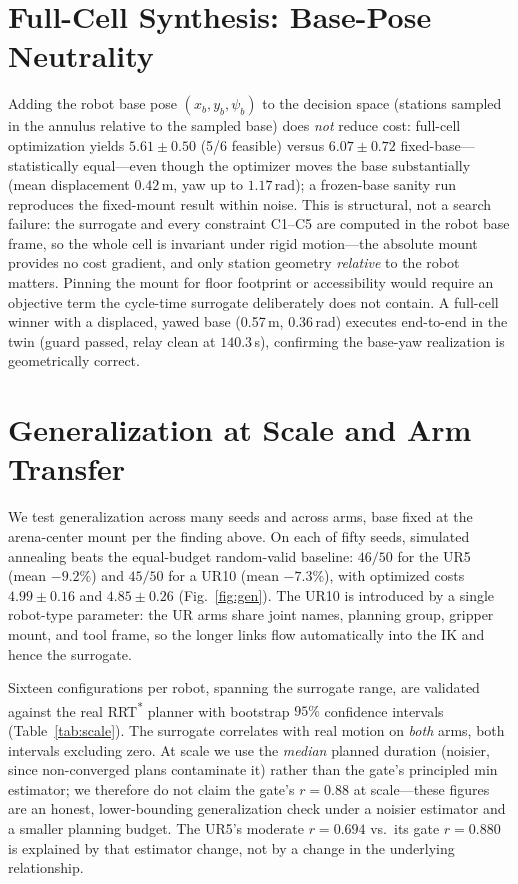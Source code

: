 \documentclass[conference]{IEEEtran}
\begin{document}
\section{Full-Cell Synthesis: Base-Pose Neutrality}
\label{sec:fullcell}
Adding the robot base pose $(x_b,y_b,\psi_b)$ to the decision space (stations sampled in the
annulus relative to the sampled base) does \emph{not} reduce cost: full-cell optimization yields
$5.61\pm0.50$ (5/6 feasible) versus $6.07\pm0.72$ fixed-base---statistically equal---even though
the optimizer moves the base substantially (mean displacement $0.42$\,m, yaw up to $1.17$\,rad);
a frozen-base sanity run reproduces the fixed-mount result within noise. This is structural, not
a search failure: the surrogate and every constraint C1--C5 are computed in the robot base
frame, so the whole cell is invariant under rigid motion---the absolute mount provides no cost
gradient, and only station geometry \emph{relative} to the robot matters. Pinning the mount for
floor footprint or accessibility would require an objective term the cycle-time surrogate
deliberately does not contain. A full-cell winner with a displaced, yawed base (0.57\,m,
0.36\,rad) executes end-to-end in the twin (guard passed, relay clean at $140.3$\,s), confirming
the base-yaw realization is geometrically correct.

\section{Generalization at Scale and Arm Transfer}
\label{sec:scale}
We test generalization across many seeds and across arms, base fixed at the arena-center mount
per the finding above. On each of fifty seeds, simulated annealing beats the equal-budget
random-valid baseline: $46/50$ for the UR5 (mean $-9.2\%$) and $45/50$ for a UR10 (mean
$-7.3\%$), with optimized costs $4.99\pm0.16$ and $4.85\pm0.26$ (Fig.~\ref{fig:gen}). The UR10
is introduced by a single robot-type parameter: the UR arms share joint names, planning group,
gripper mount, and tool frame, so the longer links flow automatically into the IK and hence the
surrogate.

Sixteen configurations per robot, spanning the surrogate range, are validated against the real
RRT\textsuperscript{*} planner with bootstrap $95\%$ confidence intervals
(Table~\ref{tab:scale}). The surrogate correlates with real motion on \emph{both} arms, both
intervals excluding zero. At scale we use the \emph{median} planned duration (noisier, since
non-converged plans contaminate it) rather than the gate's principled min estimator; we
therefore do not claim the gate's $r=0.88$ at scale---these figures are an honest,
lower-bounding generalization check under a noisier estimator and a smaller planning budget.
The UR5's moderate $r=0.694$ vs.\ its gate $r=0.880$ is explained by that estimator change, not
by a change in the underlying relationship.
\end{document}
